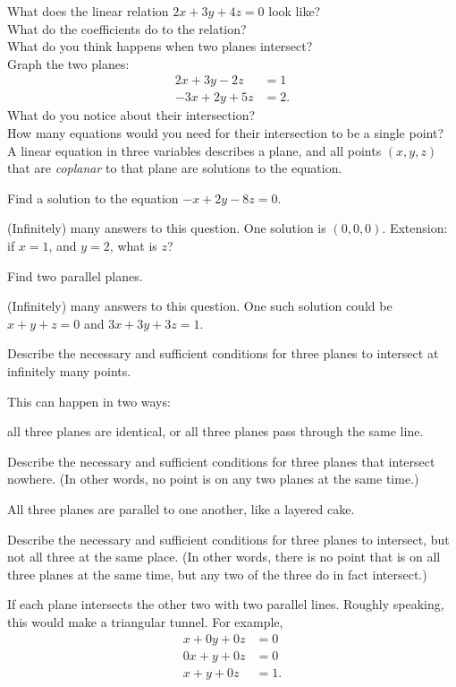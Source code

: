 \documentclass[12pt,fleqn]{book}
\newcommand{\prb}[1]{\begin{Exercise}#1\end{Exercise}}
\newcommand{\sol}[1]{\begin{Answer}#1\end{Answer}}
\begin{document}
What does the linear relation $2x+3y+4z=0$ look like?
\\[4em]
What do the coefficients do to the relation?
\\[4em]
What do you think happens when two planes intersect?
\\[4em]
Graph the two planes:
\begin{align*}
		2x+3y-2z&=1\\
		-3x+2y+5z&=2.
\end{align*}
What do you notice about their intersection?
\\[4em]
How many equations would you need for their intersection to be a single point?
\\[4em]
A linear equation in three variables describes a plane, and all points $(x,y,z)$ that are \emph{coplanar} to that plane are solutions to the equation.
\prb{Find a solution to the equation $-x+2y-8z=0$.\\[6em]}
\sol{(Infinitely) many answers to this question.  One solution is $(0,0,0)$.  Extension: if $x=1$, and $y=2$, what is $z$?}
\prb{
Find two parallel planes. \\[6em]
}
\sol{(Infinitely) many answers to this question.  One such solution could be $x+y+z=0$ and $3x+3y+3z=1.$}
\prb{Describe the necessary and sufficient conditions for three planes to intersect at infinitely many points.\\[6em]}
\sol{This can happen in two ways:
\begin{tasks}
	\task all three planes are identical, or
	\task all three planes pass through the same line.
\end{tasks}
}
\prb{Describe the necessary and sufficient conditions for three planes that intersect nowhere.  (In other words, no point is on any two planes at the same time.)
\\[6em]
}
\sol{All three planes are parallel to one another, like a layered cake.}
\prb{
Describe the necessary and sufficient conditions for three planes to intersect, but not all three at the same place.  (In other words, there is no point that is on all three planes at the same time, but any two of the three do in fact intersect.)\\[6em]
}
\sol{If each plane intersects the other two with two parallel lines.  Roughly speaking, this would make a triangular tunnel.  For example,
	\begin{align*}
		x+0y+0z&=0\\
		0x+y+0z&=0\\
		x+y+0z&=1.
	\end{align*}
}
\end{document}
